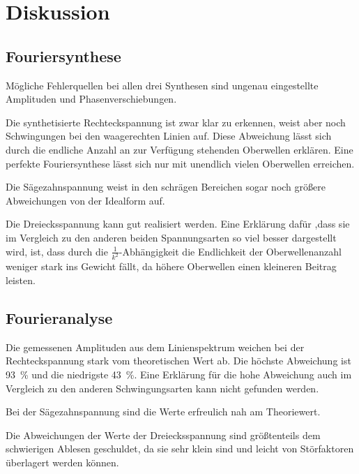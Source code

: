 \section{Diskussion}
\label{sec:Diskussion}

\subsection{Fouriersynthese}

Mögliche Fehlerquellen bei allen drei Synthesen sind ungenau
eingestellte Amplituden und Phasenverschiebungen.

Die synthetisierte Rechteckspannung ist zwar klar zu erkennen,
weist aber noch Schwingungen bei den waagerechten Linien auf.
Diese Abweichung lässt sich durch die endliche Anzahl an zur Verfügung
stehenden Oberwellen erklären.
Eine perfekte Fouriersynthese lässt sich nur mit unendlich vielen
Oberwellen erreichen.

Die Sägezahnspannung weist in den schrägen Bereichen sogar noch größere Abweichungen
von der Idealform auf.

Die Dreiecksspannung kann gut realisiert werden. Eine Erklärung dafür
,dass sie im Vergleich zu den anderen beiden Spannungsarten so viel
besser dargestellt wird, ist, dass durch die $\frac{1}{k^2}$-Abhängigkeit
die Endlichkeit der Oberwellenanzahl weniger stark ins Gewicht fällt, da
höhere Oberwellen einen kleineren Beitrag leisten.

\subsection{Fourieranalyse}

Die gemessenen Amplituden aus dem Linienspektrum weichen bei der
Rechteckspannung stark vom theoretischen Wert ab. Die höchste
Abweichung ist \SI{93}{\percent} und die niedrigste \SI{43}{\percent}.
Eine Erklärung für die hohe Abweichung auch im Vergleich zu den
anderen Schwingungsarten kann nicht gefunden werden.

Bei der Sägezahnspannung sind die Werte erfreulich nah am Theoriewert.

Die Abweichungen der Werte der Dreiecksspannung sind größtenteils
dem schwierigen Ablesen geschuldet, da sie sehr klein sind und leicht
von Störfaktoren überlagert werden können.
